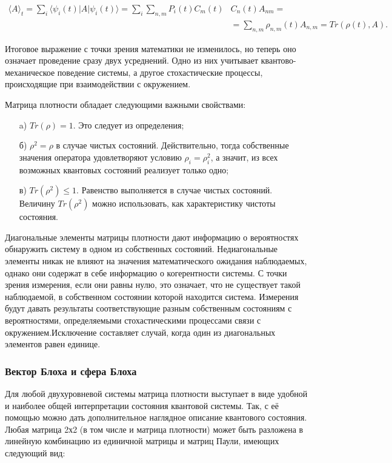  \begin{equation}
 \begin{split}
 \label{operator}
 \langle A \rangle _t = \sum_i \langle \psi_i(t) | A |\psi_i(t)\rangle = 
 \sum _i \sum_{n,m} P_i(t )C_m(t)& C_n(t) A_{nm} = \\
 &= \sum_{n,m} \rho_{n,m}(t) A_{n,m} = Tr (\rho(t), A).
 \end{split}
 \end{equation} 
 
 Итоговое выражение с точки зрения математики не изменилось, но теперь оно означает проведение сразу двух усреднений. Одно из них учитывает квантово-механическое поведение системы, а другое стохастические процессы, происходящие при взаимодействии с окружением.
 
  Матрица плотности обладает следующими важными свойствами:
 \begin{itemize}
 	\item[a)] $Tr (\rho) = 1$. Это следует из определения;
 	\item[б)] $\rho^2 = \rho$ в случае чистых состояний. Действительно, тогда собственные значения оператора удовлетворяют условию $\rho_i = \rho_i^2$, а значит, из всех возможных квантовых состояний реализует только одно;
 	\item[в)] $Tr(\rho^2) \le 1$. Равенство выполняется в случае чистых состояний. Величину $Tr(\rho^2)$ можно использовать, как характеристику чистоты состояния. 
 \end{itemize} 

  Диагональные элементы матрицы плотности дают информацию о вероятностях обнаружить систему в одном из собственных состояний. Недиагональные элементы никак не влияют на значения математического ожидания наблюдаемых, однако они содержат в себе информацию о когерентности системы. С точки зрения измерения, если они равны нулю, это означает, что не существует такой наблюдаемой, в собственном состоянии которой находится система. Измерения будут давать результаты соответствующие разным собственным состояниям с вероятностями, определяемыми стохастическими процессами связи с окружением.Исключение составляет случай, когда один из диагональных элементов равен единице. 
  
  
  
  \subsubsection{Вектор Блоха и сфера Блоха}
  
  Для любой двухуровневой системы матрица плотности выступает в виде удобной и наиболее общей интерпретации состояния квантовой системы. Так, с её помощью можно дать дополнительное наглядное описание квантового состояния. Любая матрица 2х2 (в том числе и матрица плотности) может быть разложена в линейную комбинацию из единичной матрицы и матриц Паули, имеющих следующий вид:
  
